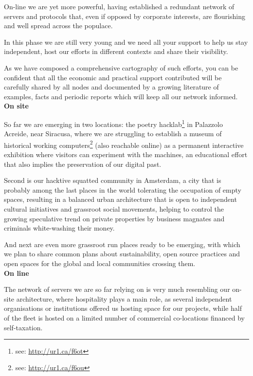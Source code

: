 On-line we are yet more powerful, having established a redundant network of
servers and protocols that, even if opposed by corporate interests, are
f\hbox{}lourishing and well spread across the populace.

In this phase we are still very young and we need all your support to help us
stay independent, host our ef\hbox{}forts in dif\hbox{}ferent contexts and share
their visibility.

As we have composed a comprehensive cartography of such ef\hbox{}forts, you can
be conf\hbox{}ident that all the economic and practical support contributed will
be carefully shared by all nodes and documented by a growing literature of
examples, facts and periodic reports which will keep all our network informed.\\

\textbf{On site}

So far we are emerging in two locations: the poetry hacklab\footnote{see:
\url{http://ur1.ca/f6ot}} in Palazzolo Acreide, near Siracusa, where we are
struggling to establish a museum of historical working computers\footnote{see:
\url{http://ur1.ca/f6ou}} (also reachable online) as a permanent interactive
exhibition where visitors can experiment with the machines, an educational
ef\hbox{}fort that also implies the preservation of our digital past.

Second is our hacktive squatted community in Amsterdam, a city that is probably
among the last places in the world tolerating the occupation of empty spaces,
resulting in a balanced urban architecture that is open to independent cultural
initiatives and grassroot social movements, helping to control the growing
speculative trend on private properties by business magnates and criminals
white-washing their money.

And next are even more grassroot run places ready to be emerging, with which we
plan to share common plans about sustainability, open source practices and open
spaces for the global and local communities crossing them.\\

\textbf{On line}

The network of servers we are so far relying on is very much resembling our
on-site architecture, where hospitality plays a main role, as several
independent organisations or institutions of\hbox{}fered us hosting space for
our projects, while half of the f\hbox{}leet is hosted on a limited number of
commercial co-locations f\hbox{}inanced by self-taxation.

